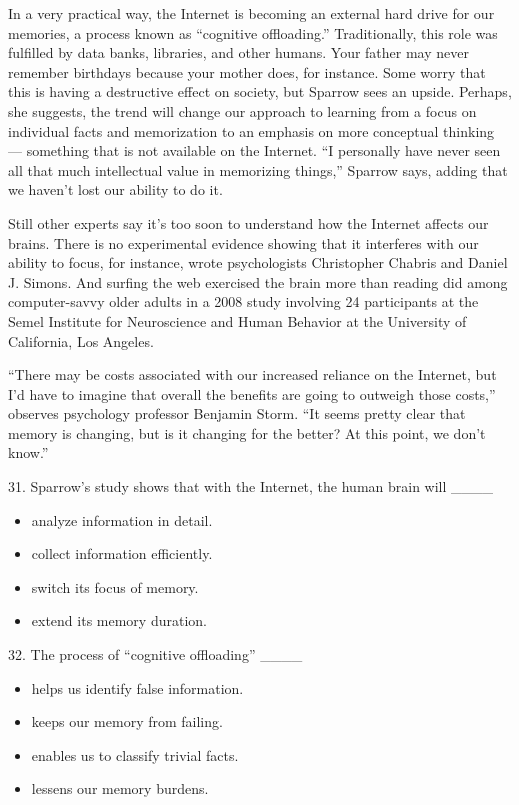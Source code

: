 \documentclass[UTF8,11pt]{ctexart}
\begin{document}
In a very practical way, the Internet is becoming an external hard drive for our memories, a process known as “cognitive offloading.” Traditionally, this role was fulfilled by data banks, libraries, and other humans. Your father may never remember birthdays because your mother does, for instance. Some worry that this is having a destructive effect on society, but Sparrow sees an upside. Perhaps, she suggests, the trend will change our approach to learning from a focus on individual facts and memorization to an emphasis on more conceptual thinking — something that is not available on the Internet. “I personally have never seen all that much intellectual value in memorizing things,” Sparrow says, adding that we haven’t lost our ability to do it.


Still other experts say it’s too soon to understand how the Internet affects our brains. There is no experimental evidence showing that it interferes with our ability to focus, for instance, wrote psychologists Christopher Chabris and Daniel J. Simons. And surfing the web exercised the brain more than reading did among computer-savvy older adults in a 2008 study involving 24 participants at the Semel Institute for Neuroscience and Human Behavior at the University of California, Los Angeles.


“There may be costs associated with our increased reliance on the Internet, but I’d have to imagine that overall the benefits are going to outweigh those costs,” observes psychology professor Benjamin Storm. “It seems pretty clear that memory is changing, but is it changing for the better? At this point, we don’t know.”


31. Sparrow’s study shows that with the Internet, the human brain will \_\_\_\_


\begin{itemize}[leftmargin=2em,itemsep=.2em,topsep=.4em]\item[A.] analyze information in detail.
\item[B.] collect information efficiently.
\item[C.] switch its focus of memory.
\item[D.] extend its memory duration.
\end{itemize}

32. The process of “cognitive offloading” \_\_\_\_


\begin{itemize}[leftmargin=2em,itemsep=.2em,topsep=.4em]\item[A.] helps us identify false information.
\item[B.] keeps our memory from failing.
\item[C.] enables us to classify trivial facts.
\item[D.] lessens our memory burdens.
\end{itemize}
\end{document}
